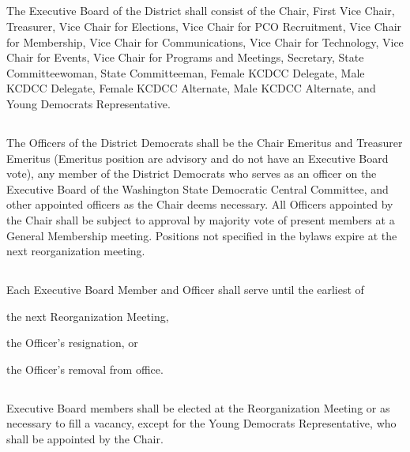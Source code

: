 \subsection{} \label{exec-board}
The Executive Board of the \fortythird{} District shall consist of the Chair, First Vice Chair, Treasurer, Vice Chair for Elections, Vice Chair for PCO Recruitment, Vice Chair for Membership, Vice Chair for Communications, Vice Chair for Technology, Vice Chair for Events, Vice Chair for Programs and Meetings, Secretary, State Committeewoman, State Committeeman, Female KCDCC Delegate, Male KCDCC Delegate, Female KCDCC Alternate, Male KCDCC Alternate, and Young Democrats Representative.

\subsection{} \label{officers}
The Officers of the \fortythird{} District Democrats shall be the Chair Emeritus and Treasurer Emeritus (Emeritus position are advisory and do not have an Executive Board vote), any member of the \fortythird{} District Democrats who serves as an officer on the Executive Board of the Washington State Democratic Central Committee, and other appointed officers as the Chair deems necessary. All Officers appointed by the Chair shall be subject to approval by majority vote of present members at a General Membership meeting. Positions not specified in the bylaws expire at the next reorganization meeting.

\subsection{}
Each Executive Board Member and Officer shall serve until the earliest of
\begin{inlinealphalist}
    \item the next Reorganization Meeting,
    \item the Officer’s resignation, or
    \item the Officer’s removal from office.
\end{inlinealphalist}

\subsection{}
Executive Board members shall be elected at the Reorganization Meeting or as necessary to fill a vacancy, except for the Young Democrats Representative, who shall be appointed by the Chair.

